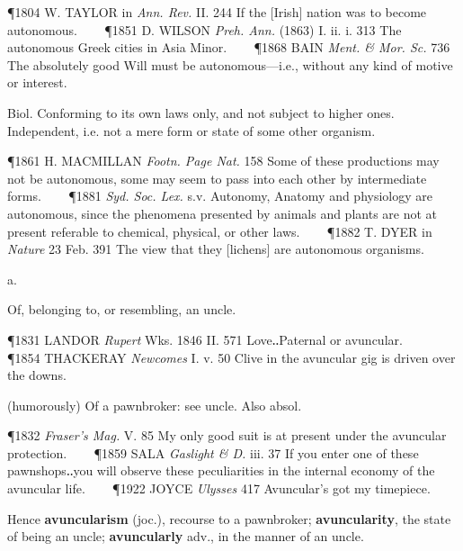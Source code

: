 \begin{description}[wide, labelwidth=!, labelindent=0pt]
\begin{myenumerate}
\P 1804 W. TAYLOR in \textit{Ann. Rev.} II. 244 If the [Irish] nation was to become autonomous.    
\P 1851 D. WILSON  \textit{Preh. Ann.} (1863) I. ii. i. 313 The autonomous Greek cities in Asia Minor.    
\P 1868 BAIN  \textit{Ment. \& Mor. Sc.} 736 The absolutely good Will must be autonomous—i.e., without any kind of motive or interest.

 Biol.  Conforming to its own laws only, and not subject to higher ones.  Independent, i.e. not a mere form or state of some other organism.

\P 1861 H. MACMILLAN  \textit{Footn. Page Nat.} 158 Some of these productions may not be autonomous, some may seem to pass into each other by intermediate forms.    
\P 1881 \textit{Syd. Soc. Lex.} s.v. Autonomy, Anatomy and physiology are autonomous, since the phenomena presented by animals and plants are not at present referable to chemical, physical, or other laws.    
\P 1882 T. DYER in \textit{Nature} 23 Feb. 391 The view that they [lichens] are autonomous organisms.
\end{myenumerate}


 a.

\noindent {}

\vspace{-0.3cm}

\begin{myenumerate}

 Of, belonging to, or resembling, an uncle.

\P 1831 LANDOR \textit{Rupert} Wks. 1846 II. 571 Love‥Paternal or avuncular.    
\P 1854 THACKERAY  \textit{Newcomes} I. v. 50 Clive in the avuncular gig is driven over the downs.

 (humorously) Of a pawnbroker: see uncle. Also absol.

\P 1832 \textit{Fraser's Mag.} V. 85 My only good suit is at present under the avuncular protection.    
\P 1859 SALA  \textit{Gaslight \& D.} iii. 37 If you enter one of these pawnshops‥you will observe these peculiarities in the internal economy of the avuncular life.    
\P 1922 JOYCE  \textit{Ulysses} 417 Avuncular's got my timepiece.

\vspace{0.2cm} \noindent
Hence \textbf{avuncularism} (joc.), recourse to a pawnbroker; \textbf{avuncularity}, the state of being an uncle; \textbf{avuncularly} adv., in the manner of an uncle.


\end{myenumerate}
\end{description}
